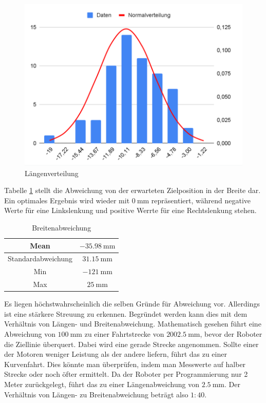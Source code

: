 \documentclass[ngerman]{tudscrreprt}
\begin{document}
\begin{figure}[H]
    \centering
    \includegraphics[scale=0.5]{images/laengenverteilung.png}
    \caption{Längenverteilung}
    \label{figure:laengenverteilung}
\end{figure}
%
Tabelle \ref{table:breitenabweichung} stellt die Abweichung von der erwarteten Zielposition in der Breite dar. Ein optimales Ergebnis wird wieder mit $\SI{0}{\mm}$ repräsentiert, während negative Werte für eine Linkslenkung und positive Werrte für eine Rechtslenkung stehen.
%
\begin{table}[H]
    \centering
    \begin{tabular}{|c|c|}
    \hline
    Mean               & $\SI{-35,98}{\mm}$ \\ \hline
    Standardabweichung & $\SI{31,15}{\mm}$ \\ \hline
    Min                & $\SI{-121}{\mm}$ \\ \hline
    Max                & $\SI{25}{\mm}$ \\ \hline
    \end{tabular}
    \caption{Breitenabweichung}
    \label{table:breitenabweichung}
\end{table}
%
Es liegen höchstwahrscheinlich die selben Gründe für Abweichung vor. Allerdings ist eine stärkere Streuung zu erkennen. Begründet werden kann dies mit dem Verhältnis von Längen- und Breitenabweichung. Mathematisch gesehen führt eine Abweichung von $\SI{100}{\mm}$ zu einer Fahrtstrecke von $\SI{2002,5}{\mm}$, bevor der Roboter die Ziellinie überquert. Dabei wird eine gerade Strecke angenommen. Sollte einer der Motoren weniger Leistung als der andere liefern, führt das zu einer Kurvenfahrt. Dies könnte man überprüfen, indem man Messwerte auf halber Strecke oder noch öfter ermittelt. Da der Roboter per Programmierung nur 2 Meter zurückgelegt, führt das zu einer Längenabweichung von $\SI{2,5}{\mm}$. Der Verhältnis von Längen- zu Breitenabweichung beträgt also $1:40$.
\end{document}
